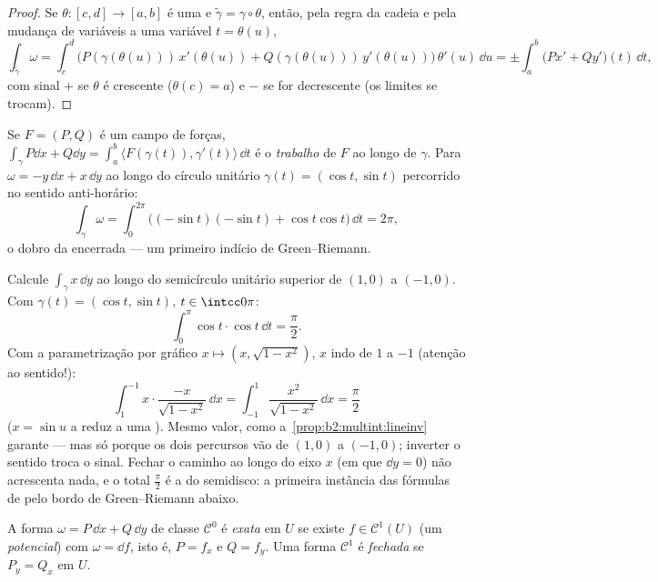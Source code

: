 \begin{proof}
Se $\theta \colon [c, d] \to [a, b]$ é uma  e
$\tilde\gamma = \gamma \circ \theta$, então, pela regra da cadeia e pela
mudança de variáveis a uma variável $t = \theta(u)$,
\[
\int_{\tilde\gamma}\omega
= \int_c^d \bigl(P(\gamma(\theta(u)))\,x'(\theta(u))
+ Q(\gamma(\theta(u)))\,y'(\theta(u))\bigr)\,\theta'(u)\,\dd u
= \pm\int_a^b \bigl(Px' + Qy'\bigr)(t)\,\dd t ,
\]
com sinal $+$ se $\theta$ é crescente ($\theta(c) = a$) e $-$
se for decrescente (os limites se trocam).
\end{proof}

\begin{example}\label{ex:b2:multint:work}
Se $F = (P, Q)$ é um campo de forças, $\int_\gamma P\dd x + Q\dd y =
\int_a^b \langle F(\gamma(t)), \gamma'(t)\rangle\,\dd t$ é o
\emph{trabalho} de $F$ ao longo de $\gamma$. Para $\omega = -y\,\dd x +
x\,\dd y$ ao longo do círculo unitário $\gamma(t) =
(\cos t, \sin t)$ percorrido no sentido anti-horário:
\[
\int_\gamma \omega
= \int_0^{2\pi}\bigl((-\sin t)(-\sin t)
+ \cos t\cos t\bigr)\,\dd t = 2\pi ,
\]
o dobro da  encerrada --- um primeiro indício de Green--Riemann.
\end{example}

\begin{example}\label{ex:b2:multint:semicircle}
Calcule $\int_\gamma x\,\dd y$ ao longo do semicírculo unitário
superior de $(1, 0)$ a $(-1, 0)$. Com $\gamma(t) =
(\cos t, \sin t)$, $t \in \intcc0\pi$:
\[
\int_0^\pi\cos t\cdot\cos t\,\dd t = \frac\pi2 .
\]
Com a parametrização por gráfico $x \mapsto (x, \sqrt{1 -
x^2})$, $x$ indo de $1$ a $-1$ (atenção ao sentido!):
\[
\int_1^{-1}x\cdot\frac{-x}{\sqrt{1 - x^2}}\,\dd x
= \int_{-1}^{1}\frac{x^2}{\sqrt{1 - x^2}}\,\dd x
= \frac\pi2
\]
($x = \sin u$ a reduz a uma ). Mesmo valor,
como a~\cref{prop:b2:multint:lineinv} garante --- mas só
porque os dois percursos vão de $(1,0)$ a $(-1,0)$; inverter o
sentido troca o sinal. Fechar o caminho ao longo do eixo $x$
(em que $\dd y = 0$) não acrescenta nada, e o total $\frac\pi2$
é a  do semidisco: a primeira instância das fórmulas de
 pelo bordo de Green--Riemann abaixo.
\end{example}

\begin{definition}\label{def:b2:multint:exact}
A forma $\omega = P\,\dd x + Q\,\dd y$ de classe $\mathcal{C}^0$
é \emph{exata} em $U$ se existe $f \in \mathcal{C}^1(U)$
(um \emph{potencial}) com $\omega = \dd f$, isto é, $P = f_x$ e $Q
= f_y$. Uma forma $\mathcal{C}^1$ é \emph{fechada} se $P_y = Q_x$ em
$U$.
\end{definition}

